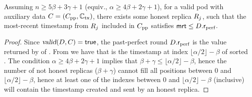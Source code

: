 \begin{lemma}\label{lem:rperf-value-of-honest}
	Assuming $n \geq 5 \beta + 3 \gamma + 1$ (equiv., $\alpha \geq 4\beta + 2 \gamma + 1$),
	for a valid pod \Pod with auxiliary data $C = (C_\text{pp}, \mathbb{C}_\text{tx})$,
	there exists some honest replica $R_j$, such that the most-recent timestamp \mrt from $R_j$ included in $C_\text{pp}$ satisfies $\textsf{mrt} \leq D.\textsf{r}_\text{perf}$.
\end{lemma}
\begin{proof}
	Since $\textsl{valid}(D, C) = \mathsf{true}$, the past-perfect round $D.\textsf{r}_\text{perf}$ is the value returned by \opMinPossibleTsForNewTx{} of .
	From  we have that \rperf is the timestamp at index $\lfloor \alpha / 2 \rfloor - \beta$ of sorted \mrt.
	The condition $\alpha \geq 4\beta + 2 \gamma + 1$ implies that $\beta + \gamma \leq \lfloor \alpha / 2 \rfloor - \beta$,
	hence the number of not honest replicas ($\beta + \gamma$) cannot fill all positions between $0$ and $\lfloor \alpha / 2 \rfloor - \beta$,
	hence at least one of the indexes between $0$ and $\lfloor \alpha / 2 \rfloor - \beta$ (inclusive) will
	contain the timestamp created and sent by an honest replica.
\end{proof}
